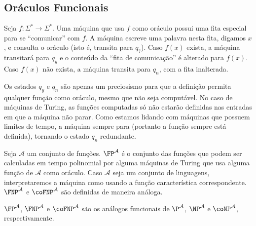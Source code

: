 \subsection{Oráculos Funcionais}

\begin{definition}
    Seja $f : \Sigma^* \rightarrow \Sigma^*$.
    Uma máquina que usa $f$ como oráculo
    possui uma fita especial para se ``comunicar'' com $f$.
    A máquina escreve uma palavra nesta fita,
    digamos $x$,
    e consulta o oráculo
    (isto é, transita para $q_?$).
    Caso $f(x)$ exista,
    a máquina transitará para $q_y$
    e o conteúdo da ``fita de comunicação'' é alterado para $f(x)$.
    Caso $f(x)$ não exista,
    a máquina transita para $q_n$,
    com a fita inalterada.
\end{definition}

Os estados $q_y$ e $q_n$ são apenas um preciosismo
para que a definição permita qualquer função como oráculo,
mesmo que não seja computável.
No caso de máquinas de Turing,
as funções computadas só não estarão definidas
nas entradas em que a máquina não parar.
Como estamos lidando com máquinas que possuem limites de tempo,
a máquina sempre para
(portanto a função sempre está definida),
tornando o estado $q_n$ redundante.

\begin{definition}
    Seja $\mathcal A$ um conjunto de funções.
    $\FP^\mathcal A$ é o conjunto das funções
    que podem ser calculadas em tempo polinomial
    por alguma máquinas de Turing que usa alguma função de $\mathcal A$ como oráculo.
    Caso $\mathcal A$ seja um conjunto de linguagens,
    interpretaremos a máquina como usando a função característica correspondente.
    $\FNP^\mathcal A$ e $\coFNP^\mathcal A$
    são definidas de maneira análoga.
\end{definition}

$\FP^\mathcal A$, $\FNP^\mathcal A$ e $\coFNP^\mathcal A$
são os análogos funcionais de
$\P^\mathcal A$, $\NP^\mathcal A$ e $\coNP^\mathcal A$,
respectivamente.

